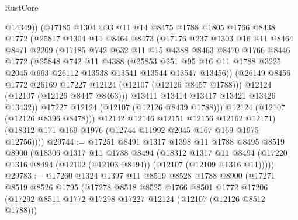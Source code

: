 \begin{lexlean}{RustCore}
\begin{coremodule}
                @14349))
            (@17185
              @1304
              @93
              @11
              @14
              @8475
              @1788
              @1805
              @1766
              @8438
              @1772
              (@25817
                @1304
                @11
                @8464
                @8473
                (@17176
                  @237
                  @1303
                  @16
                  @11
                  @8464
                  @8471
                  @2209
                  (@17185
                    @742
                    @632
                    @11
                    @15
                    @4388
                    @8463
                    @8470
                    @1766
                    @8446
                    @1772
                    (@25848
                      @742
                      @11
                      @4388
                      (@25853
                        @251
                        @95
                        @16
                        @11
                        @1788
                        @3225
                        @2045
                        @663
                        @26112
                        @13538
                        @13541
                        @13544
                        @13547
                        @13456))
                    (@26149 @8456 @1772 @26169 @17227 @12124 (@12107 (@12126 @8457 @1788)))
                    @12124
                    (@12107 (@12126 @8447 @8463)))
                  @13411
                  @13414
                  @13417
                  @13421
                  @13426
                  @13432))
              @17227
              @12124
              (@12107 (@12126 @8439 @1788)))
            @12124
            (@12107 (@12126 @8396 @8478)))
          @12142
          @12146
          @12151
          @12156
          @12162
          @12171)
        (@18312 @171 @169 @1976 (@12744 @11992 @2045 @167 @169 @1975 @12756))))
@29744 := @17251
    @8491
    @1317
    @1398
    @11
    @1788
    @8495
    @8519
    @8900
    (@18306
      @1317
      @11
      @1788
      @8494
      (@18312
        @1317
        @11
        @8494
        (@17220 @1316 @8494 (@12102 (@12103 @8494)) (@12107 (@12109 @1316 @11)))))
@29783 := @17260
    @1324
    @1397
    @11
    @8519
    @8528
    @1788
    @8900
    (@17271
      @8519
      @8526
      @1795
      (@17278
        @8518
        @8525
        @1766
        @8501
        @1772
        @17206
        (@17292 @8511 @1772 @17298 @17227 @12124 (@12107 (@12126 @8512 @1788)))

\end{coremodule}
\end{lexlean}
